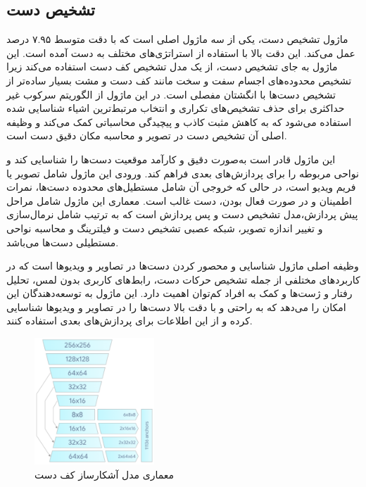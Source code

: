 \subsection{تشخیص دست\protect{}}
ماژول تشخیص دست، یکی از سه ماژول اصلی است که با دقت متوسط ۷.۹۵ درصد عمل می‌کند. این دقت بالا با استفاده از استراتژی‌های مختلف به دست آمده است. این ماژول به جای تشخیص دست، 
از یک مدل تشخیص کف دست استفاده می‌کند زیرا تشخیص محدوده‌های اجسام سفت و سخت مانند کف دست و مشت بسیار ساده‌تر از تشخیص دست‌ها با انگشتان مفصلی است. در این ماژول از
 الگوریتم سرکوب غیر حداکثری برای حذف تشخیص‌های تکراری و انتخاب مرتبط‌ترین اشیاء شناسایی شده استفاده می‌شود که به کاهش مثبت کاذب و پیچیدگی محاسباتی کمک می‌کند و وظیفه اصلی آن تشخیص دست در تصویر و محاسبه مکان دقیق دست است.

این ماژول قادر است به‌صورت دقیق و کارآمد موقعیت دست‌ها را شناسایی کند و نواحی مربوطه را برای
 پردازش‌های بعدی فراهم کند. ورودی این ماژول شامل تصویر یا فریم ویدیو است، در حالی که خروجی آن شامل مستطیل‌های محدوده دست‌ها، نمرات اطمینان و در صورت فعال بودن، دست غالب است. معماری این ماژول شامل 
 مراحل پیش پردازش،مدل تشخیص دست و پس پردازش است که به ترتیب شامل نرمال‌سازی و تغییر اندازه تصویر، شبکه عصبی تشخیص دست و فیلترینگ و محاسبه نواحی مستطیلی دست‌ها می‌باشد.

وظیفه اصلی ماژول شناسایی و محصور کردن دست‌ها در تصاویر و ویدیوها است که در کاربردهای مختلفی از جمله تشخیص حرکات دست، رابط‌های کاربری بدون لمس، تحلیل رفتار و ژست‌ها و کمک به افراد کم‌توان
 اهمیت دارد. این ماژول به توسعه‌دهندگان این امکان را می‌دهد که به راحتی و با دقت بالا دست‌ها را در تصاویر و ویدیوها شناسایی کرده و از این اطلاعات برای پردازش‌های بعدی استفاده کنند.


\begin{figure}[h]
    \centering
    \includegraphics[width=0.4\textwidth]{hand_detector.png}
    \caption{معماری مدل آشکارساز کف دست}
\end{figure}


